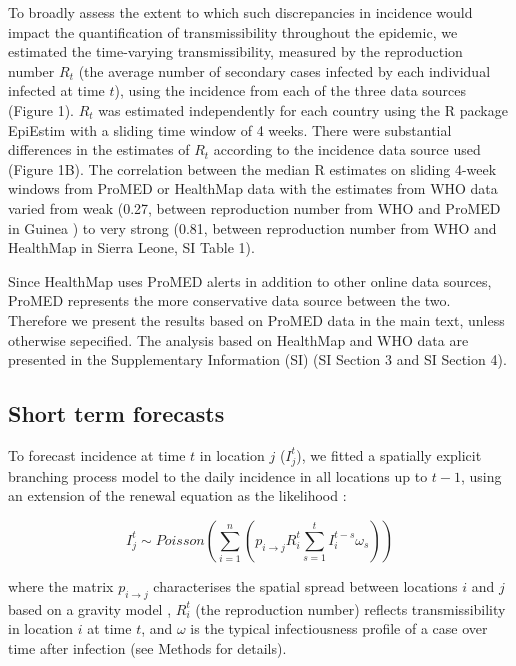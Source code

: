\documentclass[9pt,twocolumn,twoside,lineno]{pnas-new}
\begin{document}
To broadly assess the extent to which such discrepancies in incidence
would impact the quantification of transmissibility throughout the
epidemic, we estimated the time-varying transmissibility, measured by
the reproduction number \(R_t\) (the average number of secondary cases
infected by each individual infected at time \(t\)), using the incidence
from each of the three data sources (Figure 1). \(R_t\) was estimated
independently for each country using the R package EpiEstim
\cite{cori2013new} with a sliding time window of 4 weeks. There were
substantial differences in the estimates of \(R_t\) according to the
incidence data source used (Figure 1B). The correlation between the
median R estimates on sliding 4-week windows from ProMED or HealthMap
data with the estimates from WHO data varied from weak (0.27, between
reproduction number from WHO and ProMED in Guinea ) to very strong
(0.81, between reproduction number from WHO and HealthMap in Sierra
Leone, SI Table 1).

Since HealthMap uses ProMED alerts in addition to other online data
sources, ProMED represents the more conservative data source between the
two. Therefore we present the results based on ProMED data in the main
text, unless otherwise sepecified. The analysis based on HealthMap and
WHO data are presented in the
Supplementary Information (SI) (SI Section 3 and SI Section 4).


\subsection*{Short term forecasts}\label{short-term-forecasts}

To forecast incidence at time \(t\) in location \(j\) (\(I_{j}^{t}\)),
we fitted a spatially explicit branching process model to the daily
incidence in all locations up to \(t - 1\), using an extension of the
renewal equation as the likelihood \cite{fraser2007estimating}:

\begin{equation}
I_{j}^{t} \sim Poisson\left(\sum_{i = 1}^n\left({p_{i \rightarrow j} R_{i}^{t}
\sum_{s = 1}^t{I_{i}^{t - s} \omega_s}}\right)\right)
\label{eq:model}
\end{equation}

where the matrix \(p_{i \rightarrow j}\) characterises the spatial
spread between locations \(i\) and \(j\) based on a gravity model
\cite{zipf1946p}, \(R_{i}^{t}\) (the reproduction number) reflects
transmissibility in location \(i\) at time \(t\), and \(\omega\) is the
typical infectiousness profile of a case over time after infection (see
Methods for details).
\end{document}
